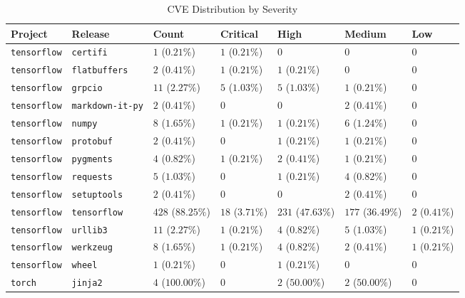\begin{table}
\caption{CVE Distribution by Severity}
\label{tab:cve-distribution}
\begin{tabular}{lllllll}
\toprule
Project & Release & Count & Critical & High & Medium & Low \\
\midrule
\texttt{tensorflow} & \texttt{certifi} & $1$ ($0.21\%$) & $1$ ($0.21\%$) & $0$ & $0$ & $0$ \\
\texttt{tensorflow} & \texttt{flatbuffers} & $2$ ($0.41\%$) & $1$ ($0.21\%$) & $1$ ($0.21\%$) & $0$ & $0$ \\
\texttt{tensorflow} & \texttt{grpcio} & $11$ ($2.27\%$) & $5$ ($1.03\%$) & $5$ ($1.03\%$) & $1$ ($0.21\%$) & $0$ \\
\texttt{tensorflow} & \texttt{markdown-it-py} & $2$ ($0.41\%$) & $0$ & $0$ & $2$ ($0.41\%$) & $0$ \\
\texttt{tensorflow} & \texttt{numpy} & $8$ ($1.65\%$) & $1$ ($0.21\%$) & $1$ ($0.21\%$) & $6$ ($1.24\%$) & $0$ \\
\texttt{tensorflow} & \texttt{protobuf} & $2$ ($0.41\%$) & $0$ & $1$ ($0.21\%$) & $1$ ($0.21\%$) & $0$ \\
\texttt{tensorflow} & \texttt{pygments} & $4$ ($0.82\%$) & $1$ ($0.21\%$) & $2$ ($0.41\%$) & $1$ ($0.21\%$) & $0$ \\
\texttt{tensorflow} & \texttt{requests} & $5$ ($1.03\%$) & $0$ & $1$ ($0.21\%$) & $4$ ($0.82\%$) & $0$ \\
\texttt{tensorflow} & \texttt{setuptools} & $2$ ($0.41\%$) & $0$ & $0$ & $2$ ($0.41\%$) & $0$ \\
\texttt{tensorflow} & \texttt{tensorflow} & $428$ ($88.25\%$) & $18$ ($3.71\%$) & $231$ ($47.63\%$) & $177$ ($36.49\%$) & $2$ ($0.41\%$) \\
\texttt{tensorflow} & \texttt{urllib3} & $11$ ($2.27\%$) & $1$ ($0.21\%$) & $4$ ($0.82\%$) & $5$ ($1.03\%$) & $1$ ($0.21\%$) \\
\texttt{tensorflow} & \texttt{werkzeug} & $8$ ($1.65\%$) & $1$ ($0.21\%$) & $4$ ($0.82\%$) & $2$ ($0.41\%$) & $1$ ($0.21\%$) \\
\texttt{tensorflow} & \texttt{wheel} & $1$ ($0.21\%$) & $0$ & $1$ ($0.21\%$) & $0$ & $0$ \\
\texttt{torch} & \texttt{jinja2} & $4$ ($100.00\%$) & $0$ & $2$ ($50.00\%$) & $2$ ($50.00\%$) & $0$ \\
\bottomrule
\end{tabular}
\end{table}
